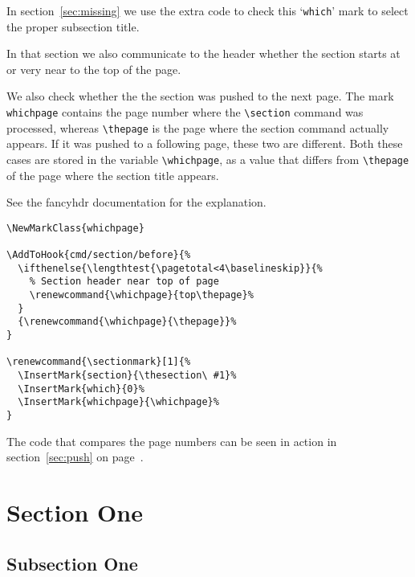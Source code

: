 \documentclass{article}
\renewcommand{\sectionmark}[1]{%
    \markboth{\thesection. #1}{}}
\newcommand\whichpage{}
\begin{document}
\noindent
\begin{boxedminipage}{\textwidth}

In section~\ref{sec:missing} we use the extra code to check this `\texttt{which}' mark to select the proper subsection title.

In that section we also communicate to the header whether the section starts at or very near to the top of the page.

We also check whether the the section was pushed to the next page.
The mark \texttt{whichpage} contains the page number where the \verb|\section|
command was processed, whereas \verb|\thepage| is the page where the section
command actually appears. If it was pushed to a following page, these two are different.
Both these cases are stored in the variable \verb|\whichpage|, as a value that differs from \verb|\thepage| of the page where the section title appears.

See the \textsf{fancyhdr} documentation for the explanation.

\MakeLinkTarget{}\label{good_code}
\begin{verbatim}
\NewMarkClass{whichpage}

\AddToHook{cmd/section/before}{%
  \ifthenelse{\lengthtest{\pagetotal<4\baselineskip}}{%
    % Section header near top of page
    \renewcommand{\whichpage}{top\thepage}%
  }
  {\renewcommand{\whichpage}{\thepage}}%
}

\renewcommand{\sectionmark}[1]{%
  \InsertMark{section}{\thesection\ #1}%
  \InsertMark{which}{0}%
  \InsertMark{whichpage}{\whichpage}%
}
\end{verbatim}

The code that compares the page numbers can be seen in action in section~\ref{sec:push} on page~\pageref{sec:push}.

\end{boxedminipage}

\newpage
\pagestyle{fancy}

\section{Section One}

\subsection{Subsection One}
\end{document}
